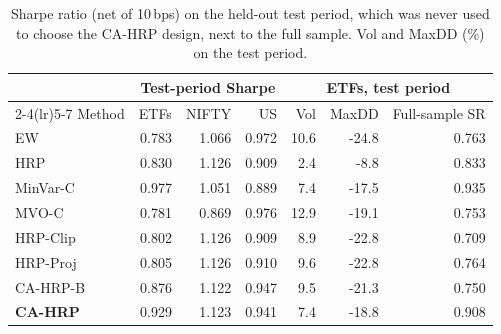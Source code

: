 \begin{table}[!htbp]\centering\small
\caption{Sharpe ratio (net of 10\,bps) on the held-out test period, which was never used to choose the CA-HRP design, next to the full sample. Vol and MaxDD (\%) on the test period.}\label{tab:test}
\begin{tabular}{l rrr rrr}\toprule
 & \multicolumn{3}{c}{Test-period Sharpe} & \multicolumn{3}{c}{ETFs, test period}\\
\cmidrule(lr){2-4}\cmidrule(lr){5-7}
Method & ETFs & NIFTY & US & Vol & MaxDD & Full-sample SR\\\midrule
EW & 0.783 & 1.066 & 0.972 & 10.6 & -24.8 & 0.763\\
HRP & 0.830 & 1.126 & 0.909 & 2.4 & -8.8 & 0.833\\
MinVar-C & 0.977 & 1.051 & 0.889 & 7.4 & -17.5 & 0.935\\
MVO-C & 0.781 & 0.869 & 0.976 & 12.9 & -19.1 & 0.753\\
HRP-Clip & 0.802 & 1.126 & 0.909 & 8.9 & -22.8 & 0.709\\
HRP-Proj & 0.805 & 1.126 & 0.910 & 9.6 & -22.8 & 0.764\\
CA-HRP-B & 0.876 & 1.122 & 0.947 & 9.5 & -21.3 & 0.750\\
\textbf{CA-HRP} & 0.929 & 1.123 & 0.941 & 7.4 & -18.8 & 0.908\\
\bottomrule\end{tabular}\end{table}